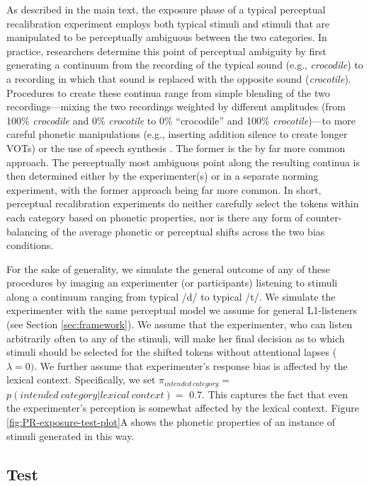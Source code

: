 \documentclass[
  11pt,
  man,floatsintext]{apa6}
\begin{document}
As described in the main text, the exposure phase of a typical perceptual recalibration experiment employs both typical stimuli and stimuli that are manipulated to be perceptually ambiguous between the two categories. In practice, researchers determine this point of perceptual ambiguity by first generating a continuum from the recording of the typical sound (e.g., \emph{crocodile}) to a recording in which that sound is replaced with the opposite sound (\emph{crocotile}). Procedures to create these continua range from simple blending of the two recordings---mixing the two recordings weighted by different amplitudes (from 100\% \emph{crocodile} and 0\% \emph{crocotile} to 0\% ``crocodile'' and 100\% \emph{crocotile})---to more careful phonetic manipulations (e.g., inserting addition silence to create longer VOTs) or the use of speech synthesis \autocite[for an insightful critique of the frequently used blending procedure, see][]{theodore-cummings2021}. The former is the by far more common approach. The perceptually most ambiguous point along the resulting continua is then determined either by the experimenter(s) or in a separate norming experiment, with the former approach being far more common. In short, perceptual recalibration experiments do neither carefully select the tokens within each category based on phonetic properties, nor is there any form of counter-balancing of the average phonetic or perceptual shifts across the two bias conditions.

For the sake of generality, we simulate the general outcome of any of these procedures by imaging an experimenter (or participants) listening to stimuli along a continuum ranging from typical /d/ to typical /t/. We simulate the experimenter with the same perceptual model we assume for general L1-listeners (see Section \ref{sec:framework}). We assume that the experimenter, who can listen arbitrarily often to any of the stimuli, will make her final decision as to which stimuli should be selected for the shifted tokens without attentional lapses (\(\lambda=0)\). We further assume that experimenter's response bias is affected by the lexical context. Specifically, we set \(\pi_{intended~category} =\) \(p(intended~category | lexical~context) =\) 0.7. This captures the fact that even the experimenter's perception is somewhat affected by the lexical context. Figure \ref{fig:PR-exposure-test-plot}A shows the phonetic properties of an instance of stimuli generated in this way.

\hypertarget{test}{%
\subsection{Test}\label{test}}
\end{document}
